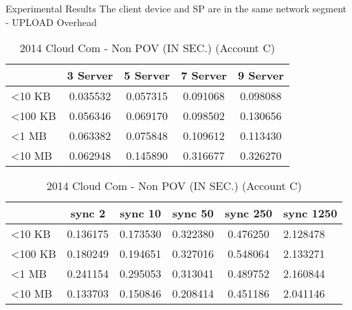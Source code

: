 \begin{frame}{Experimental Results}
{The client device and SP are in the same network segment - UPLOAD Overhead}
	\scriptsize
    \begin{table}[]
    \centering
    \caption{My Method - Non POV (IN SEC.) (Account C)}
    \begin{tabular}{lcccc}
     					 & 3 Server & 5 Server & 7 Server & 9 Server \\ \hline
        \textless 10 KB  & 0.035532 & 0.057315 & 0.091068 & 0.098088 \\ \hline
        \textless 100 KB & 0.056346 & 0.069170 & 0.098502 & 0.130656 \\ \hline
        \textless 1 MB   & 0.063382 & 0.075848 & 0.109612 & 0.113430 \\ \hline
        \textless 10 MB  & 0.062948 & 0.145890 & 0.316677 & 0.326270 \\ \hline
    \end{tabular}
    \caption{2014 Cloud Com - Non POV (IN SEC.) (Account C)}
    \begin{tabular}{lccccl}
       					 & sync 2   & sync 10  & sync 50  & sync 250 & sync 1250 \\ \hline
        \textless 10 KB  & 0.136175 & 0.173530 & 0.322380 & 0.476250 & 2.128478  \\ \hline
        \textless 100 KB & 0.180249 & 0.194651 & 0.327016 & 0.548064 & 2.133271  \\ \hline
        \textless 1 MB   & 0.241154 & 0.295053 & 0.313041 & 0.489752 & 2.160844  \\ \hline
        \textless 10 MB  & 0.133703 & 0.150846 & 0.208414 & 0.451186 & 2.041146  \\ \hline
    \end{tabular}
    \end{table}
\end{frame}

